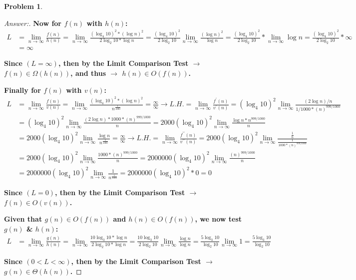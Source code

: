 \documentclass[11pt]{article}
\theoremstyle{definition}
\theoremstyle{definition}
\newtheorem{required}{Problem}
\theoremstyle{definition}
\begin{document}
\begin{required}
\begin{enumerate} [label=(\alph*)]
\begin{proof}[Answer:]
\item \textbf{Now for $f(n)$ with $h(n)$:}
\begin{align*}
L &= \lim_{n \to \infty} \frac{f(n)}{h(n)} = \lim_{n \to \infty} \frac{(\log_4 10)^2 * (\log n)^2}{2\log_2 10 * \log n} =  \frac{(\log_4 10)^2}{2\log_2 10} \lim_{n \to \infty} \frac{(\log n)^2}{\log n} = \frac{(\log_4 10)^2}{2\log_2 10} * \lim_{n \to \infty} \log n = \frac{(\log_4 10)^2}{2\log_2 10} * \infty \\
&= \infty
\end{align*}
\item \textbf{Since $(L = \infty)$, then by the Limit Comparison Test $\to$ $f(n) \in \Omega(h(n))$, and thus $\to$ $h(n) \in O(f(n))$.}

\item \textbf{Finally for $f(n)$ with $v(n)$:}
\begin{align*}
L &= \lim_{n \to \infty} \frac{f(n)}{v(n)} = \lim_{n \to \infty} \frac{(\log_4 10)^2 * (\log n)^2}{n^{\frac{1}{1000}}} = \frac{\infty}{\infty} \to L.H. = \lim_{n \to \infty} \frac{f^{\prime}(n)}{v^{\prime}(n)} = (\log_4 10)^2 \lim_{n \to \infty} \frac{(2\log n) / n}{1 / 1000 * (n)^{999/1000}} \\
&= (\log_4 10)^2 \lim_{n \to \infty} \frac{(2\log n) *  1000 * (n)^{999/1000}}{n} =  2000(\log_4 10)^2 \lim_{n \to \infty} \frac{\log n *  n^{999/1000}}{n} \\
&= 2000(\log_4 10)^2 \lim_{n \to \infty} \frac{\log n}{n^{\frac{1}{1000}}} = \frac{\infty}{\infty} \to L.H. = \lim_{n \to \infty} \frac{f^{\prime\prime}(n)}{v^{\prime\prime}(n)} = 2000(\log_4 10)^2 \lim_{n \to \infty} \frac{\frac{1}{n}}{\frac{1}{1000 * (n)^{999/1000}}} \\
&= 2000(\log_4 10)^2 \lim_{n \to \infty} \frac{1000 * (n)^{999/1000}}{n} = 2000000(\log_4 10)^2 \lim_{n \to \infty} \frac{(n)^{999/1000}}{n} \\
&= 2000000(\log_4 10)^2 \lim_{n \to \infty} \frac{1}{n^{\frac{1}{1000}}} = 2000000(\log_4 10)^2 * 0 = 0
\end{align*}
\item \textbf{Since $(L = 0)$, then by the Limit Comparison Test $\to$ $f(n) \in O(v(n))$.}

\item \textbf{Given that $g(n) \in O(f(n))$ and $h(n) \in O(f(n))$, we now test $g(n)$ \& $h(n)$:}
\begin{align*}
L &= \lim_{n \to \infty} \frac{g(n)}{h(n)} = \lim_{n \to \infty} \frac{10\log_3 10 * \log n}{2\log_2 10 * \log n} = \frac{10\log_3 10}{2\log_2 10} \lim_{n \to \infty} \frac{\log n}{\log n} = \frac{5\log_3 10}{\log_2 10} \lim_{n \to \infty} 1 = \frac{5\log_3 10}{\log_2 10}
\end{align*}
\item \textbf{Since $(0 < L < \infty)$, then by the Limit Comparison Test $\to$ $g(n) \in \Theta(h(n))$.}


\end{proof}
\end{enumerate}
\end{required}
\end{document}
